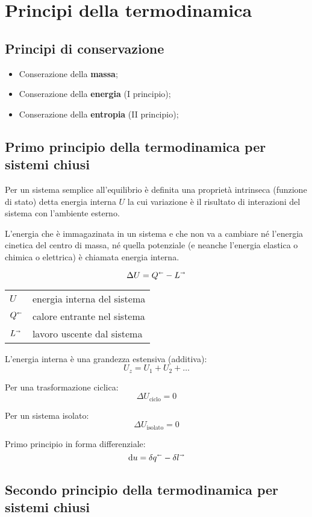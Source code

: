\section{Principi della termodinamica}

\subsection{Principi di conservazione}
\begin{itemize}
    \item Conserazione della \textbf{massa};
    \item Conserazione della \textbf{energia} (I principio);
    \item Conserazione della \textbf{entropia} (II principio);
\end{itemize}

\subsection{Primo principio della termodinamica per sistemi chiusi}
Per un sistema semplice all’equilibrio è definita una proprietà intrinseca (funzione di stato) detta energia interna $U$ la cui variazione è il risultato di interazioni del sistema con l’ambiente esterno.

L'energia che è immagazinata in un sistema e che non va a cambiare né l'energia cinetica del centro di massa, né quella potenziale (e neanche l'energia elastica o chimica o elettrica) è chiamata energia interna.

\[\Delta U = Q^\shortleftarrow - L^\shortrightarrow \]

\begin{tabular}{ll}
    $U$ & energia interna del sistema \\
    $Q^\shortleftarrow$ & calore entrante nel sistema\\
    $L^\shortrightarrow$ & lavoro uscente dal sistema\\
\end{tabular}

L'energia interna è una grandezza estensiva (additiva):
\[U_z = U_1 + U_2 + \ldots\]

Per una trasformazione ciclica:
\[\Delta U_{\text{ciclo}} = 0 \]

Per un sistema isolato:
\[\Delta U_{\text{isolato}} = 0\]

Primo principio in forma differenziale:
\[\dd{u} = \var{q^\shortleftarrow} - \var{l^\shortrightarrow}\]

\subsection{Secondo principio della termodinamica per sistemi chiusi}

